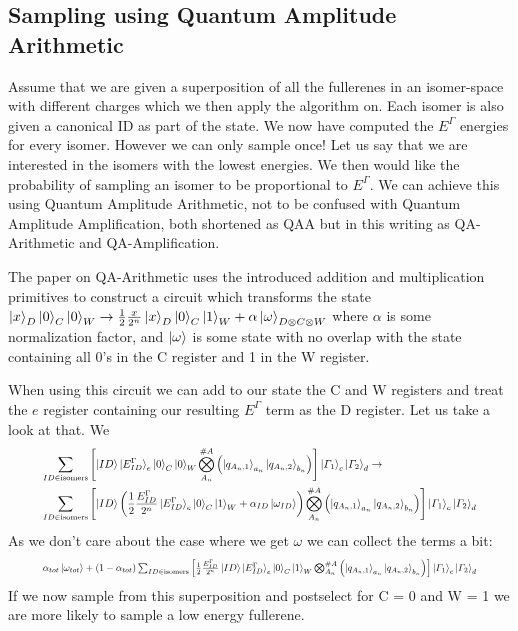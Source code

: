 \documentclass{article}
\begin{document}
\subsection{Sampling using Quantum Amplitude Arithmetic}
Assume that we are given a superposition of all the fullerenes in an isomer-space with different charges which we then apply the algorithm on. Each isomer is also given a canonical ID as part of the state. We now have computed the $E^\Gamma$ energies for every isomer. However we can only sample once! Let us say that we are interested in the isomers with the lowest energies. We then would like the probability of sampling an isomer to be proportional to $E^\Gamma$. We can achieve this using Quantum Amplitude Arithmetic, not to be confused with Quantum Amplitude Amplification, both shortened as QAA but in this writing as QA-Arithmetic and QA-Amplification. 


\vspace{\baselineskip}
The paper on QA-Arithmetic uses the introduced addition and multiplication primitives to construct a circuit which transforms the state $\ket{x}_D\ket{0}_C\ket{0}_W \to \frac{1}{2}\frac{x}{2^n}\ket{x}_D\ket{0}_C\ket{1}_W+\alpha\ket{\omega}_{D \otimes C\otimes W}$ where $\alpha$ is some normalization factor, and $\ket{\omega}$ is some state with no overlap with the state containing all 0's in the C register and 1 in the W register.


\vspace{\baselineskip}
When using this circuit we can add to our state the C and W registers and treat the $e$ register containing our resulting $E^\Gamma$ term as the D register. Let us take a look at that.
We
\begin{equation}
   \resizebox{.9\hsize}{!}{$\begin{split}
        \sum_{ID\in \text{isomers}}&\left [ \ket{ID}\ket{E^\Gamma_{ID}}_e\ket{0}_C\ket{0}_W\bigotimes_{A_n}^{\#A}\left ( \ket{q_{A_n,1}}_{a_n}\ket{q_{A_n,2}}_{b_n}\right ) \right ] \ket{\varGamma_1}_c\ket{\varGamma_2}_d \to\\ 
        \sum_{ID\in \text{isomers}}&\left [ \ket{ID}\left(\frac{1}{2}\frac{E^\Gamma_{ID}}{2^n}\ket{E^\Gamma_{ID}}_e\ket{0}_C\ket{1}_W+\alpha_{ID}\ket{\omega_{ID}}\right)\bigotimes_{A_n}^{\#A}\left ( \ket{q_{A_n,1}}_{a_n}\ket{q_{A_n,2}}_{b_n}\right ) \right ] \ket{\varGamma_1}_c\ket{\varGamma_2}_d\\ 
   \end{split}$}
\end{equation}
As we don't care about the case where we get $\omega$ we can collect the terms a bit:
\begin{equation}
    \resizebox{.9\hsize}{!}{$\alpha_{tot}\ket{\omega_{tot}} + (1-\alpha_{tot})\sum_{ID\in \text{isomers}}\left [ \frac{1}{2}\frac{E^\Gamma_{ID}}{2^n}\ket{ID}\ket{E^\Gamma_{ID}}_e\ket{0}_C\ket{1}_W\bigotimes_{A_n}^{\#A}\left ( \ket{q_{A_n,1}}_{a_n}\ket{q_{A_n,2}}_{b_n}\right ) \right ] \ket{\varGamma_1}_c\ket{\varGamma_2}_d$}\\ 
\end{equation}
If we now sample from this superposition and postselect for C = 0 and W = 1 we are more likely to sample a low energy fullerene. 
\end{document}

